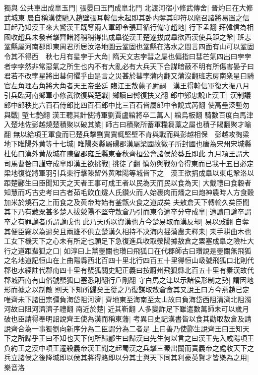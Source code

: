 獨與公共車出成臯玉門|{
	張晏曰玉門成臯北門}
北渡河宿小修武傳舍|{
	晉灼曰在大修武城東}
晨自稱漢使馳入趙壁張耳韓信未起即其卧内奪其印符以麾召諸將易置之信耳起乃知漢王來大驚漢王既奪兩人軍即令張耳循行備守趙地|{
	行下孟翻}
拜韓信為相國收趙兵未發者擊齊諸將稍稍得出成臯從漢王楚遂拔成臯欲西漢使兵距之鞏|{
	班志鞏縣屬河南郡即東周君所居汝洛地圖云鞏固也鞏縣在洛水之間言四面有山可以鞏固}
令其不得西　秋七月有星孛于大角|{
	隋天文志孛彗之屬也偏指曰彗芒氣四出曰孛孛者孛孛然非常惡氣之所生也内不有大亂必有大兵天下合謀暗蔽不明有所傷害晏子曰君若不改孛星將出彗何懼乎由是言之災甚於彗孛蒲内翻又蒲沒翻班志房南衆星曰騎官左角理右角將大角者天王帝坐廷}
臨江王敖薨子尉嗣　漢王得韓信軍復大振八月引兵臨河南鄉軍小修武欲復與楚戰|{
	鄉讀曰嚮復扶又翻}
郎中鄭忠說止漢王|{
	漢制議郎中郎秩比六百石侍郎比四百石郎中比三百石皆屬郎中令說式芮翻}
使高壘深塹勿與戰|{
	塹七艶翻}
漢王聽其計使將軍劉賈盧綰將卒二萬人|{
	綰烏板翻}
騎數百度白馬津入楚地佐彭越燒楚積聚以破其業|{
	師古曰積聚所蓄軍糧芻藁之屬也積子賜翻聚才喻翻}
無以給項王軍食而已楚兵擊劉賈賈輒堅壁不肯與戰而與彭越相保　彭越攻徇梁地下睢陽外黄等十七城|{
	睢陽秦縣屬碭郡漢屬梁國故微子所封國也唐為宋州宋城縣杜佑曰漢外黄故城在陳留郡雍丘縣東春秋齊桓公會諸侯於葵丘即此}
九月項王謂大司馬曹咎曰謹守成臯即漢王欲挑戰|{
	挑徒了翻}
慎勿與戰勿令得東而已我十五日必定梁地復從將軍羽引兵東行擊陳留外黄睢陽等城皆下之　漢王欲捐成臯以東屯鞏洛以距楚酈生曰臣聞知天之天者王事可成王者以民為天而民以食為天|{
	大戴禮曰食穀者知慧而巧古史考曰古者茹毛飲血燧人氏鑚火而人始裹肉而燔之曰炮神農時人方食穀加米於燒石之上而食之及黄帝時始有釜甑火食之道成矣}
夫敖倉天下轉輸久矣臣聞其下乃有藏粟甚多楚人拔滎陽不堅守敖倉乃引而東令適卒分守成臯|{
	適讀曰讁卒謂卒之有罪讁者所謂讁戊也}
此乃天所以資漢也方今楚易取而漢反却|{
	易以䜴翻}
自奪其便臣竊以為過矣且兩雄不俱立楚漢久相持不决海内揺蕩農夫釋耒|{
	耒手耕曲木也}
工女下機天下之心未有所定也願足下急復進兵收取滎陽據敖倉之粟塞成臯之險杜大行之道距蜚狐之口|{
	如淳曰上黨壺關也瓚曰飛狐口在代郡師古曰瓚說是壺關無飛狐之名地道記恒山在上曲陽縣西北百四十里北行四百五十里得恒山岋號飛狐口北則代郡也水經註代郡南四十里有蜚狐關史記正義曰按蔚州飛狐縣北百五十里有秦漢故代郡城西南有山俗號蜚狐口塞悉則翻行戶剛翻}
守白馬之津以示諸侯形制之勢|{
	謂因地形而據之以制敵}
則天下知所歸矣王從之乃復謀取敖倉食其又說王曰方今燕趙已定唯齊未下諸田宗彊負海岱阻河濟|{
	齊地東至海南至太山故曰負海岱西阻清濟北阻濁河故曰阻河濟濟子禮翻}
南近於楚|{
	近其靳翻}
人多變詐足下雖遣數萬師未可以歲月破也臣請得奉明詔說齊王使為漢而稱東藩|{
	考異曰史記漢書皆以食其勸取敖倉及請說齊合為一事獨劉向新序分為二臣謂分為二者是}
上曰善乃使酈生說齊王曰王知天下之所歸乎王曰不知也天下何所歸酈生曰歸漢曰先生何以言之曰漢王先入咸陽項王負約王之漢中項王遷殺義帝漢王聞之起蜀漢之兵擊三秦出關而責義帝之處收天下之兵立諸侯之後降城即以侯其將得賂即以分其士與天下同其利豪英賢才皆樂為之用|{
	樂音洛}
